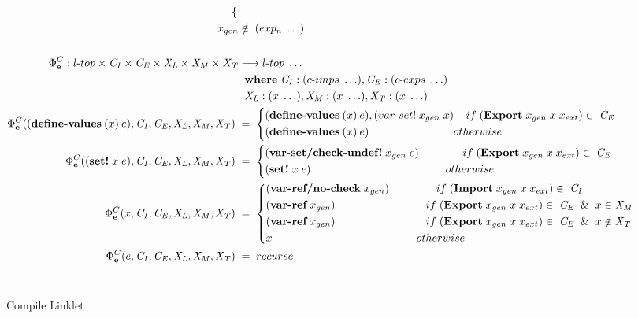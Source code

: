 \documentclass[sigplan,screen,anonymous]{acmart}
\def\dash {\text{-}}
\begin{document}
\begin{figure*}[tbp]
\begin{align*}
\begin{cases*}
    \end{cases*} \\
    \;     x_{gen} &\notin\; (exp_n\; \ldots) \\ \\
    \Phi^C_{\textbf{e}} : l\dash top \times \mathit{C_I} \times \mathit{C_E} \times \mathit{X_L} \times \mathit{X_M} \times\mathit{X_T} &\longrightarrow l\dash top\; \ldots \\
    \;          &\;\; \where \mathit{C_I} : (c\dash imps\;\ldots), \mathit{C_E} : (c\dash exps\;\ldots) \\
    \;          &\;\; \mathit{X_L} : (x\;\ldots), \mathit{X_M} : (x\;\ldots), \mathit{X_T} : (x\;\ldots) \\
    \Phi^C_{\textbf{e}}((\textbf{define\dash values}\:(x)\:e),\mathit{C_I}, \mathit{C_E}, \mathit{X_L},\mathit{X_M},\mathit{X_T})\; &=\; \begin{cases*}
      (\textbf{define\dash values}\:(x)\:e), (var\dash set!\; x_{gen}\; x)\;\; \;\; if\; (\textbf{Export}\; x_{gen}\; x\; x_{ext}) \in\;\mathit{C_E} \\
      (\textbf{define\dash values}\:(x)\:e) \hspace{2.5cm} \;\; otherwise
    \end{cases*} \\
    \Phi^C_{\textbf{e}}((\textbf{set!}\; x\; e),\mathit{C_I}, \mathit{C_E}, \mathit{X_L},\mathit{X_M},\mathit{X_T})\; &=\; \begin{cases*}
      (\textbf{var\dash set/check\dash undef!}\; x_{gen}\; e) \hspace{1.4cm} if\; (\textbf{Export}\; x_{gen}\; x\; x_{ext}) \in\;\mathit{C_E}\\
      (\textbf{set!}\; x\; e) \hspace{4.3cm} otherwise
    \end{cases*} \\
    \Phi^C_{\textbf{e}}(x,\mathit{C_I}, \mathit{C_E}, \mathit{X_L},\mathit{X_M},\mathit{X_T})\; &=\; \begin{cases*}
      (\textbf{var\dash ref/no\dash check}\; x_{gen}) \hspace{1.5cm} if\; (\textbf{Import}\; x_{gen}\; x\; x_{ext}) \in\;\mathit{C_I} \\
      (\textbf{var\dash ref}\; x_{gen}) \hspace{2.9cm} if\; (\textbf{Export}\; x_{gen}\; x\; x_{ext}) \in\;\mathit{C_E}\;\; \&\;\; x\in \mathit{X_M} \\
      (\textbf{var\dash ref}\; x_{gen}) \hspace{2.9cm} if\; (\textbf{Export}\; x_{gen}\; x\; x_{ext}) \in\;\mathit{C_E}\;\; \&\;\; x\notin \mathit{X_T} \\
      x \hspace{4.6cm} otherwise
    \end{cases*} \\
    \Phi^C_{\textbf{e}}(e,\mathit{C_I}, \mathit{C_E}, \mathit{X_L},\mathit{X_M},\mathit{X_T})\; &=\; recurse \\
  \end{align*} \\
\caption{Compile Linklet}
\label{fig:compile}
\end{figure*}
\end{document}
